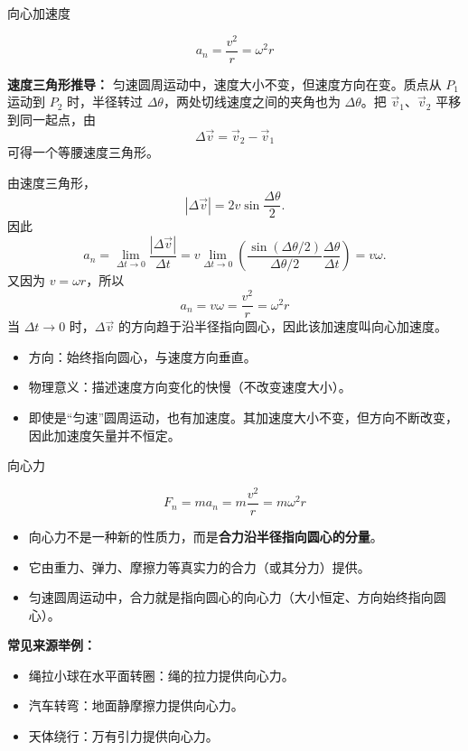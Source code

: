 \begin{conceptbox}{向心加速度}

\[
\boxed{a_n = \frac{v^2}{r} = \omega^2 r}
\]

\textbf{速度三角形推导：} 匀速圆周运动中，速度大小不变，但速度方向在变。质点从 $P_1$ 运动到 $P_2$ 时，半径转过 $\Delta\theta$，两处切线速度之间的夹角也为 $\Delta\theta$。把 $\vec v_1$、$\vec v_2$ 平移到同一起点，由
\[
\Delta\vec v=\vec v_2-\vec v_1
\]
可得一个等腰速度三角形。

\begin{center}


\label{fig:centripetal-acceleration-derivation}
\end{center}

由速度三角形，
\[
|\Delta\vec v|=2v\sin\frac{\Delta\theta}{2}.
\]
因此
\[
a_n=\lim_{\Delta t\to0}\frac{|\Delta\vec v|}{\Delta t}
=v\lim_{\Delta t\to0}
\left(\frac{\sin(\Delta\theta/2)}{\Delta\theta/2}
\frac{\Delta\theta}{\Delta t}\right)
=v\omega.
\]
又因为 $v=\omega r$，所以
\[
a_n=v\omega=\frac{v^2}{r}=\omega^2r
\]
当 $\Delta t\to0$ 时，$\Delta\vec v$ 的方向趋于沿半径指向圆心，因此该加速度叫向心加速度。

\begin{itemize}
  \item 方向：始终指向圆心，与速度方向垂直。
  \item 物理意义：描述速度方向变化的快慢（不改变速度大小）。
  \item 即使是“匀速”圆周运动，也有加速度。其加速度大小不变，但方向不断改变，因此加速度矢量并不恒定。
\end{itemize}

\end{conceptbox}

\begin{conceptbox}{向心力}

\[
\boxed{F_n = m a_n = m\frac{v^2}{r} = m\omega^2 r}
\]

\begin{itemize}
  \item 向心力不是一种新的性质力，而是\textbf{合力沿半径指向圆心的分量}。
  \item 它由重力、弹力、摩擦力等真实力的合力（或其分力）提供。
  \item 匀速圆周运动中，合力就是指向圆心的向心力（大小恒定、方向始终指向圆心）。
\end{itemize}

\textbf{常见来源举例：}
\begin{itemize}
  \item 绳拉小球在水平面转圈：绳的拉力提供向心力。
  \item 汽车转弯：地面静摩擦力提供向心力。
  \item 天体绕行：万有引力提供向心力。
\end{itemize}

\end{conceptbox}

